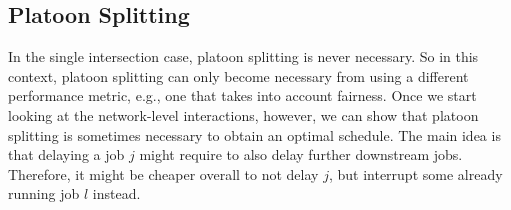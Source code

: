 \documentclass{article}
\theoremstyle{definition}
\theoremstyle{plain}
\begin{document}
\subsection{Platoon Splitting}

In the single intersection case, platoon splitting is never necessary. So in
this context, platoon splitting can only become necessary from using a different
performance metric, e.g., one that takes into account fairness. Once we start
looking at the network-level interactions, however, we can show that platoon
splitting is sometimes necessary to obtain an optimal schedule. The main idea is
that delaying a job $j$ might require to also delay further downstream jobs.
Therefore, it might be cheaper overall to not delay $j$, but interrupt some
already running job $l$ instead.




\end{document}
